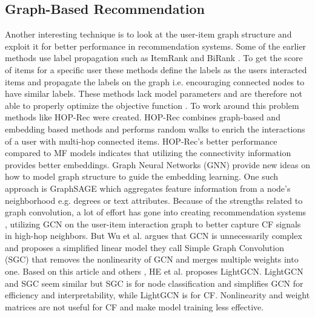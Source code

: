 \subsection{Graph-Based Recommendation}
Another interesting technique is to look at the user-item graph structure and exploit it for better performance in recommendation systems.
Some of the earlier methods use label propagation such as ItemRank \cite{ItemRank} and BiRank \cite{BiRank}.
To get the score of items for a specific user these methods define the labels as the users interacted items and propagate the labels on the graph i.e. encouraging connected nodes to have similar labels.
These methods lack model parameters and are therefore not able to properly optimize the objective function \cite{NGCF_2019}.
To work around this problem methods like HOP-Rec \cite{HOP_Rec} were created.
HOP-Rec combines graph-based and embedding based methods and performs random walks to enrich the interactions of a user with multi-hop connected items.
HOP-Rec's better performance compared to MF models indicates that utilizing the connectivity information provides better embeddings.
Graph Neural Networks (GNN) provide new ideas on how to model graph structure to guide the embedding learning.
One such approach is GraphSAGE \cite{IND_REP_LEA} which aggregates feature information from a node's neighborhood e.g. degrees or text attributes.
Because of the strengths related to graph convolution, a lot of effort has gone into creating recommendation systems \cite{NGCF_2019,GC_MC,Priceaware}, utilizing GCN on the user-item interaction graph to better capture CF signals in high-hop neighbors.
But Wu et al. \cite{SGCN} argues that GCN is unnecessarily complex and proposes a simplified linear model they call Simple Graph Convolution (SGC) that removes the nonlinearity of GCN and merges multiple weights into one.
Based on this article and others \cite{PRE_PROP,DEEP_GCN}, HE et al. \cite{lightgcn} proposes LightGCN.
LightGCN and SGC seem similar but SGC is for node classification and simplifies GCN for efficiency and interpretability, while LightGCN is for CF.
Nonlinearity and weight matrices are not useful for CF and make model training less effective.
